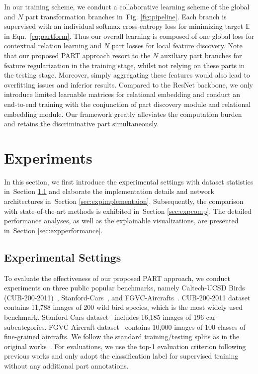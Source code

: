 \documentclass[journal]{IEEEtran}
\newcommand{\figref}[1]{Fig. \ref{#1}}
\newcommand{\secref}[1]{Section \ref{#1}}
\begin{document}
In our training scheme, we conduct a collaborative learning scheme of the global and $N$ part transformation branches in~\figref{fig:pipeline}. Each branch is supervised with an individual softmax cross-entropy loss for minimizing target $\mathbb{E}$ in Eqn.~\eqref{eq:partform}. Thus our overall learning is composed of one global loss for contextual relation learning and $N$ part losses for local feature discovery. Note that our proposed PART approach resort to the $N$ auxiliary part branches for feature regularization in the training stage, whilst not relying on these parts in the testing stage. Moreover, simply aggregating these features would also lead to overfitting issues and inferior results. Compared to the ResNet backbone, we only introduce limited learnable matrices for relational embedding and conduct an end-to-end training with the conjunction of part discovery module and relational embedding module. Our framework greatly alleviates the computation burden and retains the discriminative part simultaneously.

\section{Experiments}\label{sec:experiment}
In this section, we first introduce the experimental settings with dataset statistics in~\secref{sec:expsettings} and elaborate the implementation details and network architectures in~\secref{sec:expimplementaion}. Subsequently, the comparison with state-of-the-art methods is exhibited in~\secref{sec:expcomp}. The detailed performance analyses, as well as the explainable visualizations, are presented in~\secref{sec:expperformance}.

\subsection{Experimental Settings}\label{sec:expsettings}
To evaluate the effectiveness of our proposed PART approach, we conduct experiments on three public popular benchmarks, namely Caltech-UCSD Birds (CUB-200-2011)~\cite{wah2011caltech}, Stanford-Cars~\cite{krause20133d}, and FGVC-Aircrafts~\cite{maji2013fine}. CUB-200-2011 dataset~\cite{wah2011caltech} contains 11,788 images of 200 wild bird species, which is the most widely used benchmark. Stanford-Cars dataset~\cite{krause20133d} includes 16,185 images of 196 car subcategories. FGVC-Aircraft dataset~\cite{maji2013fine} contains 10,000 images of 100 classes of fine-grained aircrafts.
We follow the standard training/testing splits as in the original works~\cite{wah2011caltech,krause20133d,maji2013fine}. For evaluations, we use the top-1 evaluation criterion following previous works and only adopt the classification label for supervised training without any additional part annotations.
\end{document}
